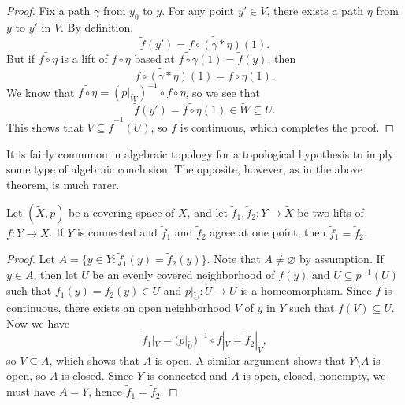 \begin{proof}
  Fix a path $\gamma$ from $y_0$ to $y$. For any
  point $y' \in V$, there exists a path $\eta$ from $y$
  to $y'$ in $V$. By definition,
  \[
    \widetilde{f}(y') = \widetilde{f \circ (\gamma * \eta)}(1).
  \]
  But if $\widetilde{f \circ \eta}$ is a lift of
  $f \circ \eta$ based at
  $\widetilde{f \circ \gamma}(1) = \widetilde{f}(y)$, then
  \[
    \widetilde{f \circ (\gamma * \eta)}(1)
    = \widetilde{f \circ \eta}(1).
  \]
  We know that $\widetilde{f \circ \eta} = (p|_{\widetilde{W}})^{-1} \circ f \circ \eta$, so we see that
  \[
    \widetilde{f}(y') = \widetilde{f \circ \eta}(1)
    \in \widetilde{W} \subseteq U.
  \]
  This shows that $V \subseteq \widetilde{f}^{-1}(U)$, so
  $\widetilde{f}$ is continuous, which completes the proof.
\end{proof}

\begin{remark}
  It is fairly commmon in algebraic topology for a topological
  hypothesis to imply some type of algebraic conclusion.
  The opposite, however, as in the above theorem, is much rarer.
\end{remark}

\begin{lemma}
  Let $(\widetilde{X}, p)$ be a covering space of $X$, and
  let $\widetilde{f}_1, \widetilde{f}_2 : Y \to \widetilde{X}$
  be two lifts of $f : Y \to X$. If $Y$ is connected and
  $\widetilde{f}_1$ and $\widetilde{f}_2$ agree at one
  point, then $\widetilde{f}_1 = \widetilde{f}_2$.
\end{lemma}

\begin{proof}
  Let $A = \{y \in Y : \widetilde{f}_1(y) = \widetilde{f}_2(y)\}$.
  Note that $A \ne \varnothing$ by assumption. If
  $y \in A$, then let $U$ be an evenly covered neighborhood
  of $f(y)$ and $\widetilde{U} \subseteq p^{-1}(U)$ such that
  $\widetilde{f}_1(y) = \widetilde{f}_2(y) \in \widetilde{U}$
  and $p|_{\widetilde{U}} : \widetilde{U} \to U$ is a homeomorphism.
  Since $f$ is continuous, there exists an open neighborhood
  $V$ of $y$ in $Y$ such that $f(V) \subseteq U$. Now we have
  \[
    \widetilde{f}_1|_V = (p|_{\widetilde{U}})^{-1} \circ f|_V
    = \widetilde{f}_2|_V,
  \]
  so $V \subseteq A$, which shows that $A$ is open.
  A similar argument shows that $Y \setminus A$ is open,
  so $A$ is closed. Since $Y$ is connected and
  $A$ is open, closed, nonempty, we must have
  $A = Y$, hence $\widetilde{f}_1 = \widetilde{f}_2$.
\end{proof}

